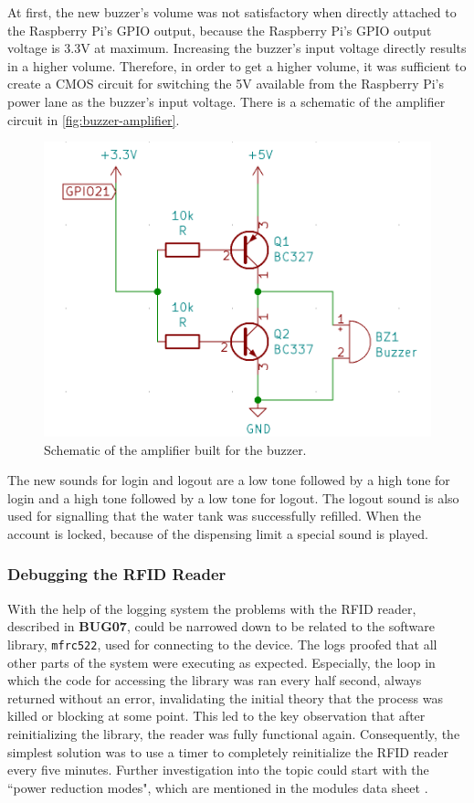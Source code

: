 \documentclass[12pt]{article}
\begin{document}
At first, the new buzzer's volume was not satisfactory when directly attached to the Raspberry Pi's GPIO output,
because the Raspberry Pi's GPIO output voltage is 3.3V at maximum.
Increasing the buzzer's input voltage directly results in a higher volume.
Therefore, in order to get a higher volume,
it was sufficient to create a CMOS circuit for switching the 5V available from the Raspberry Pi's power lane as the buzzer's input voltage.
There is a schematic of the amplifier circuit in \autoref{fig:buzzer-amplifier}.
\begin{figure}[h]
  \centering
  \includegraphics[width=15cm]{./images/buzzer-schema.png}
  \caption{Schematic of the amplifier built for the buzzer.}
  \label{fig:buzzer-amplifier}
\end{figure}

The new sounds for login and logout are a low tone followed by a high tone for login and a high tone followed by a low tone for logout.
The logout sound is also used for signalling that the water tank was successfully refilled.
When the account is locked, because of the dispensing limit a special sound is played.

\subsubsection{Debugging the RFID Reader}
With the help of the logging system the problems with the RFID reader, described in \textbf{BUG07},
could be narrowed down to be related to the software library, \texttt{mfrc522}, used for connecting to the device.
The logs proofed that all other parts of the system were executing as expected. 
Especially, the loop in which the code for accessing the library was ran every half second, always returned without an error,
invalidating the initial theory that the process was killed or blocking at some point.
This led to the key observation that after reinitializing the library, the reader was fully functional again.
Consequently, the simplest solution was to use a timer to completely reinitialize the RFID reader every five minutes.
Further investigation into the topic could start with the ``power reduction modes", which are mentioned in the modules data sheet \cite{MFRC522:doc}.
\end{document}
